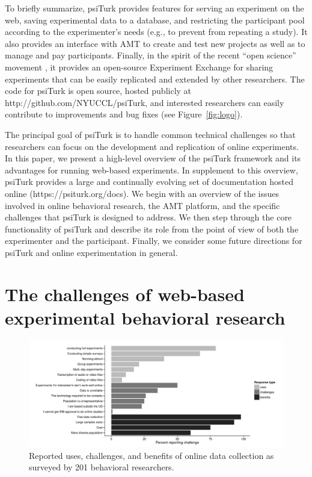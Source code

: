 \documentclass[twocolumn]{svjour3}          %
\newcommand{\psiturk}[0]{\textsf{psiTurk}}
\begin{document}
To briefly summarize, \psiturk{} provides features for serving an 
experiment on the web, saving experimental data to a database, and restricting the 
participant pool according to the experimenter's needs (e.g., to prevent from repeating a study). It also provides an interface with AMT to 
create and test new projects as well as to manage and pay participants. Finally, in 
the spirit of the recent ``open science'' movement \citep{Collaboration:2012vf},
it provides  an open-source Experiment Exchange for sharing experiments 
that can be easily replicated and extended by other researchers.  The code for 
\psiturk{} is open source, hosted publicly at
\textsf{http://github.com/NYUCCL/psiTurk}, and interested researchers can easily 
contribute to improvements and bug fixes (see Figure~\ref{fig:logo}).

The principal goal of \psiturk{} is to handle common technical 
challenges so that researchers can focus on the development and replication
of online experiments.  In this paper, we present a high-level overview of the 
\psiturk{} framework and its advantages for running web-based experiments.
In supplement to this overview, \psiturk{} provides a large and continually
evolving set of documentation hosted online (\textsf{https://psiturk.org/docs}).
We begin with an overview of the issues involved in online 
behavioral research,  the AMT platform, and the specific challenges that \psiturk{} is designed to 
address.  We then  step through the core functionality of \psiturk{} and 
describe its role from the point of view of both the experimenter and the participant.  Finally, we
consider some future directions for \psiturk{} and online experimentation in 
general.



\section{The challenges of web-based experimental behavioral research}

\begin{figure}[tp]
\centering
\includegraphics[width=\textwidth]{figures/combinedquestions2.pdf}
\caption{Reported uses, challenges, and benefits of online data collection as surveyed
by 201 behavioral researchers.}
\label{fig:survey}
\end{figure}
\end{document}
